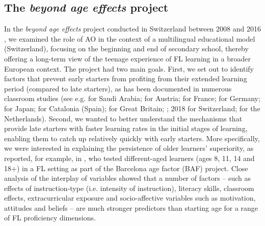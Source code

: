\documentclass[output=paper,modfonts,nonflat,newtxmath]{langsci/langscibook}
\begin{document}
\subsection{The \textit{beyond age effects} project}
\label{sec:pfenninger:2.1.}

In the \textit{beyond age effects} project conducted in Switzerland between 2008 and 2016 \citep{Pfenninger2017}, we examined the role of AO in the context of a multilingual educational model (Switzerland), focusing on the beginning and end of secondary school, thereby offering a long-term view of the teenage experience of FL learning in a broader European context. The project had two main goals. First, we set out to identify factors that prevent early starters from profiting from their extended learning period (compared to late starters), as has been documented in numerous classroom studies (see e.g. \citealt{Al-Thubaiti2010} for Saudi Arabia; \citealt{Buchholz2007} for Austria; \citealt{Genelot1997} for France; \citealt{JaekelEtAl2017} for Germany; \citealt{Larson-Hall2008} for Japan; \citealt{Muñoz2006} for Catalonia (Spain); \citealt{GrahamEtAl2017} for Great Britain; \citealt{Pfenninger2017}; 2018 for Switzerland; \citealt{UnsworthEtAl2015} for the Netherlands). Second, we wanted to better understand the mechanisms that provide late starters with faster learning rates in the initial stages of learning, enabling them to catch up relatively quickly with early starters. More specifically, we were interested in explaining the persistence of older learners’ superiority, as reported, for example, in \citet{Muñoz2006}, who tested different-aged learners (ages 8, 11, 14 and 18+) in a FL setting as part of the Barcelona age factor (BAF) project. Close analysis of the interplay of variables showed that a number of factors – such as effects of instruction-type (i.e. intensity of instruction), literacy skills, classroom effects, extracurricular exposure and socio-affective variables such as motivation, attitudes and beliefs – are much stronger predictors than starting age for a range of FL proficiency dimensions.
\end{document}
